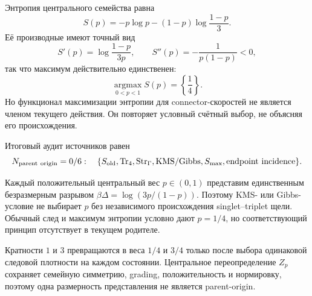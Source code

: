 Энтропия центрального семейства равна
\begin{equation}
 S(p)=-p\log p-(1-p)\log\frac{1-p}{3}.
 \label{eq:v8-baryon-c0-central-weight-entropy}
\end{equation}
Её производные имеют точный вид
\begin{equation}
 S'(p)=\log\frac{1-p}{3p},
 \qquad
 S''(p)=-\frac{1}{p(1-p)}<0,
 \label{eq:v8-baryon-c0-central-weight-entropy-derivatives}
\end{equation}
так что максимум действительно единственен:
\begin{equation}
 \operatorname*{argmax}_{0<p<1}S(p)=\left\{\frac14\right\}.
 \label{eq:v8-baryon-c0-central-weight-maximum-entropy-candidate}
\end{equation}
Но функционал максимизации энтропии для connector-скоростей не является
членом текущего действия. Он повторяет условный счётный выбор, не объясняя
его происхождения.

Итоговый аудит источников равен
\begin{equation}
 N_{\rm parent\ origin}=0/6:
 \quad\{S_{\rm old},\operatorname{Tr}_4,\operatorname{Str}_{\Gamma},\text{KMS/Gibbs},
 S_{\max},\text{endpoint incidence}\}.
 \label{eq:v8-baryon-c0-central-weight-parent-origin-ledger}
\end{equation}

\begin{theorem}
Каждый положительный центральный вес $p\in(0,1)$ представим единственным
безразмерным разрывом $\beta\Delta=\log(3p/(1-p))$. Поэтому KMS- или
Gibbs-условие не выбирает $p$ без независимого происхождения
singlet--triplet щели. Обычный след и максимум энтропии условно дают
$p=1/4$, но соответствующий принцип отсутствует в текущем родителе.
\end{theorem}

\begin{nogocriterion}
Кратности $1$ и $3$ превращаются в веса $1/4$ и $3/4$ только после выбора
одинаковой следовой плотности на каждом состоянии. Центральное
переопределение $Z_p$ сохраняет семейную симметрию, grading,
положительность и нормировку, поэтому одна размерность представления не
является parent-origin.
\end{nogocriterion}

